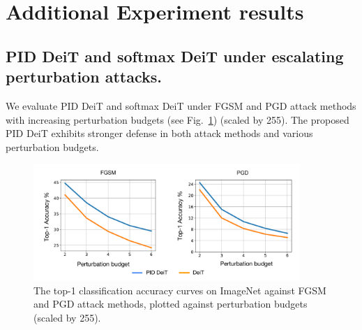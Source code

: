 \section{Additional Experiment results}
\subsection{PID DeiT and softmax DeiT under escalating perturbation attacks.}
We evaluate PID DeiT and softmax DeiT under FGSM and PGD attack methods with increasing perturbation budgets (see Fig.~\ref{fig:pid-deit-more-attacks}) (scaled by 255). The proposed PID DeiT exhibits stronger defense in both attack methods and various perturbation budgets.
\label{secapp:moreattacks}
\begin{figure}[!t]
\centering
\includegraphics[width=0.9\textwidth]{iclr_2023/pictures/moreattacks.pdf}
\caption{\small The top-1 classification accuracy curves on ImageNet against FGSM and PGD attack methods, plotted against perturbation budgets (scaled by 255).}
\label{fig:pid-deit-more-attacks} 
\end{figure}
